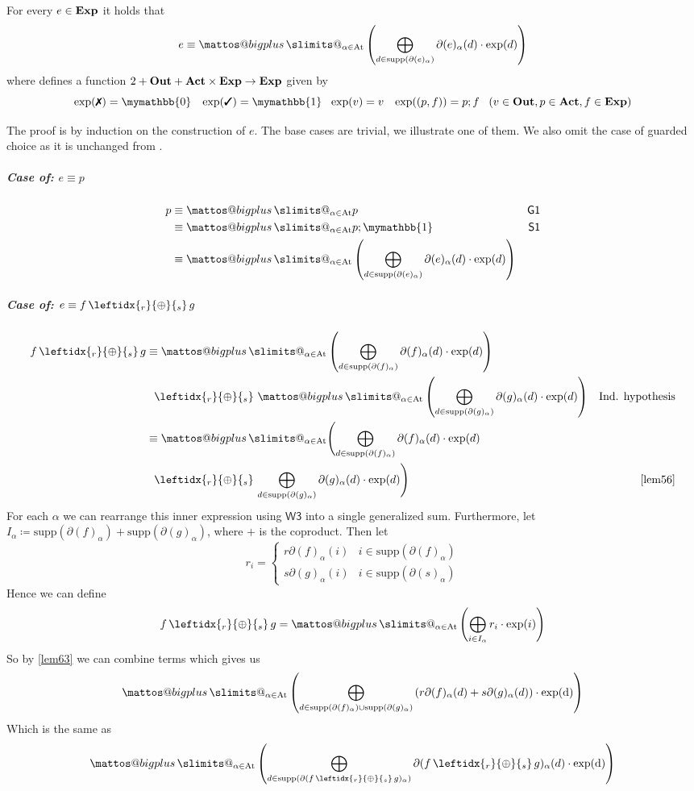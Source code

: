 \documentclass[a4paper,UKenglish,cleveref, autoref, thm-restate]{lipics-v2021}
\makeatletter
\newcommand{\cmark}{\text{\ding{51}}}
\newcommand{\xmark}{\text{\ding{55}}}
\newcommand{\Out}{\textbf{\upshape{Out}}}
\newcommand{\Act}{\textbf{\upshape{Act}}}
\newcommand{\At}{\text{\upshape{At}}}
\newcommand{\Exp}{\textbf{\upshape{Exp}}}
\newcommand{\ex}{\text{\upshape{exp}}}
\newcommand{\WC}[2]{\,\leftidx{_{#1}}{{\oplus}}{_{#2}}\,}
\newcommand{\Ax}[1]{\ensuremath{\mathsf{#1}}}
\newcommand{\bskip}{\mymathbb{1}}
\newcommand{\babort}{\mymathbb{0}}
\newcommand{\probgkat}{\textsf{\upshape{ProbGKAT}}\xspace}
\theoremstyle{plain}\newtheoremrep{thm}{Theorem}[section]
\newcommand{\bigplus}{\DOTSB\mathop{\mathpalette\mattos@bigplus\relax}\slimits@
}
\newcommand\mattos@bigplus[2]{\vcenter{\hbox{\sbox\z@{$#1\sum$}\resizebox{!}{0.9\dimexpr\ht\z@+\dp\z@}{\raisebox{\depth}{$\m@th#1+$}}}}\vphantom{\sum}}
\makeatother
\begin{document}
	\begin{thmrep}
		For every $e \in \Exp$ it holds that $$e \equiv \bigplus_{\alpha \in \At} \left(\bigoplus_{d \in \text{supp}(\partial(e)_\alpha)}\partial(e)_\alpha(d) \cdot \ex(d)\right)$$
		where  defines a function $2+\Out+\Act\times\Exp \to \Exp$ given by
		$$\exp(\xmark) = \babort \;\;\;\exp(\cmark) = \bskip \;\;\;\ex(v) = v \;\;\;\exp((p, f)) = p;f \;\;\; (v \in \Out, p \in \Act, f \in \Exp)$$\label{fundamentaltheorem}
	\end{thmrep}
	\begin{appendixproof}
	The proof is by induction on the construction of $e$. The base cases are trivial, we illustrate one of them. We also omit the case of guarded choice as it is unchanged from \probgkat \cite{rozowski2023probabilistic}.
	\subparagraph*{Case of: $e\equiv p$}
	\begin{align*}
		p &\equiv \bigplus_{\alpha \in \At} p & \Ax{G1}\\
		&\equiv \bigplus_{\alpha \in \At} p;\bskip & \Ax{S1}\\
		&\equiv \bigplus_{\alpha \in \At}\left(\bigoplus_{d \in \text{supp}(\partial(e)_\alpha)} \partial(e )_\alpha(d)\cdot \text{exp}(d)\right) &
	\end{align*}
	\subparagraph*{Case of: $e \equiv f \WC{r}{s} g$}
	\begin{align*}
		f \WC{r}{s} g &\equiv \bigplus_{\alpha \in \At} \left(\bigoplus_{d \in \text{supp}(\partial(f)_\alpha)}\partial(f)_\alpha(d) \cdot \text{exp}(d)\right) \\&\;\;\WC{r}{s} \bigplus_{\alpha \in \At} \left(\bigoplus_{d \in \text{supp}(\partial(g)_\alpha)}\partial(g)_\alpha(d) \cdot \text{exp}(d)\right)& \text{Ind. hypothesis}\\
		&\equiv\bigplus_{\alpha \in \At} \Biggl( \bigoplus_{d \in \text{supp}(\partial(f)_\alpha)}\partial(f)_\alpha(d) \cdot \text{exp}(d)\\&\;\; \WC{r}{s} \bigoplus_{d \in \text{supp}(\partial(g)_\alpha)}\partial(g)_\alpha(d) \cdot \text{exp}(d)\Biggl)& \cref{lem56}
	\end{align*}
	For each $\alpha$ we can rearrange this inner expression using \Ax{W3} into a single generalized sum. Furthermore, let $I_\alpha \coloneq \text{supp}(\partial(f)_\alpha) + \text{supp}(\partial(g)_\alpha)$, where $+$ is the coproduct. Then let $$r_i = \begin{cases}
		r\partial(f)_\alpha(i)& i \in \text{supp}(\partial(f)_\alpha)\\s\partial(g)_\alpha(i)& i \in \text{supp}(\partial(s)_\alpha)
	\end{cases}$$
	Hence we can define $$f \WC{r}{s} g = \bigplus_{\alpha \in \At}\left(\bigoplus_{i\in I_\alpha} r_i\cdot \text{exp}(i)\right)$$
	So by \cref{lem63} we can combine terms which gives us
	$$\bigplus_{\alpha \in \At}\left(\bigoplus_{d \in \text{supp}(\partial(f)_\alpha) \cup \text{supp}(\partial(g)_\alpha)} \left(r\partial(f)_\alpha(d) + s\partial(g)_\alpha(d)\right)\cdot \text{exp(d)}\right)$$
	Which is the same as
	$$\bigplus_{\alpha \in \At}\left(\bigoplus_{d \in \text{supp}(\partial(f \WC{r}{s} g)_\alpha)} \partial(f \WC{r}{s} g)_\alpha(d)\cdot \text{exp(d)}\right)$$
	

\end{appendixproof}
\end{document}
